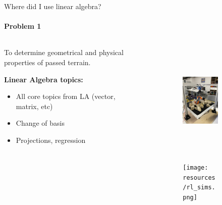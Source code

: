 \documentclass[aspectratio=169,notes]{beamer}
\begin{document}
\begin{frame}[t]{Where did I use linear algebra?}
    \framesubtitle{Problem 1}
    \vspace{-0.3cm}
    \begin{columns}[T,onlytextwidth]
        \begin{column}{0.34\textwidth}
            To determine geometrical and physical properties of passed terrain. \medskip

            \textbf{Linear Algebra topics:}
            \begin{itemize}
                \item All core topics from LA (vector, matrix, etc)
                \item Change of basis
                \item Projections, regression
            \end{itemize}
        \end{column}
        \begin{column}{0.64\textwidth}
            \vspace{-0.4cm}
            \begin{figure}[H]
                \begin{subfigure}{0.49\textwidth}
                    \centering\includegraphics[height=5.5cm,width=1\textwidth,keepaspectratio]{resources/view.jpg}
                    \label{fig:resources/view.jpg}
                \end{subfigure}
                \begin{subfigure}{0.49\textwidth}
                    \centering\texttt{[image: resources/rl\_sims.png]}
                    \label{fig:resources/rl_sims.png}
                \end{subfigure}
            \end{figure}
        \end{column}
    \end{columns}
\end{frame}
\end{document}
